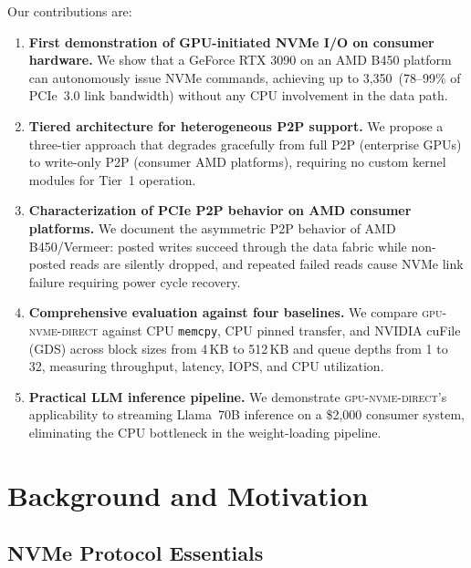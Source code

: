 \documentclass{article}
\newcommand{\sysname}{\textsc{gpu-nvme-direct}}
\newcommand{\MBs}{\,\text{MB/s}}
\begin{document}
Our contributions are:

\begin{enumerate}[leftmargin=*,topsep=2pt,itemsep=1pt]

\item \textbf{First demonstration of GPU-initiated NVMe I/O on consumer
  hardware.} We show that a GeForce RTX 3090 on an AMD B450 platform can
  autonomously issue NVMe commands, achieving up to 3{,}350\MBs{} (78--99\% of
  PCIe~3.0 link bandwidth) without any CPU involvement in the data path.

\item \textbf{Tiered architecture for heterogeneous P2P support.} We propose a
  three-tier approach that degrades gracefully from full P2P (enterprise GPUs)
  to write-only P2P (consumer AMD platforms), requiring no custom kernel
  modules for Tier~1 operation.

\item \textbf{Characterization of PCIe P2P behavior on AMD consumer
  platforms.} We document the asymmetric P2P behavior of AMD B450/Vermeer:
  posted writes succeed through the data fabric while non-posted reads are
  silently dropped, and repeated failed reads cause NVMe link failure requiring
  power cycle recovery.

\item \textbf{Comprehensive evaluation against four baselines.} We compare
  \sysname{} against CPU \texttt{memcpy}, CPU pinned transfer, and NVIDIA
  cuFile (GDS) across block sizes from 4\,KB to 512\,KB and queue depths from
  1 to 32, measuring throughput, latency, IOPS, and CPU utilization.

\item \textbf{Practical LLM inference pipeline.} We demonstrate \sysname{}'s
  applicability to streaming Llama~70B inference on a \$2{,}000 consumer
  system, eliminating the CPU bottleneck in the weight-loading pipeline.

\end{enumerate}

\section{Background and Motivation}
\label{sec:background}

\subsection{NVMe Protocol Essentials}
\end{document}
